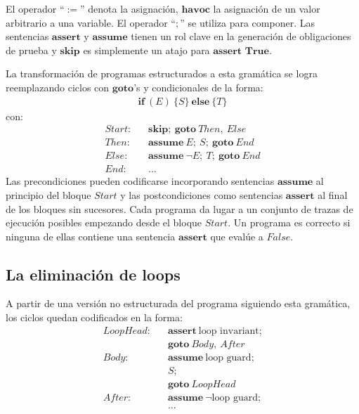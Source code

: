 \documentclass[12pt, a4paper, openany, fleqn]{book}
\begin{document}
    El operador ``$:=$'' denota la asignación, $\textbf{havoc}$ la asignación de un valor arbitrario a una variable. El operador ``$;$'' se utiliza para componer. Las sentencias $\textbf{assert}$ y $\textbf{assume}$ tienen un rol clave en la generación de obligaciones de prueba y $\textbf{skip}$ es simplemente un atajo para $\textbf{assert True}$.

    La transformación de programas estructurados a esta gramática se logra reemplazando ciclos con $\textbf{goto}$'s y condicionales de la forma:
    \begin{align*}
        \textbf{if}\ (E)\ \{S\}\ \textbf{else}\ \{T\}
    \end{align*}
    con:
    \begin{align*}
        Start:&\;\;\;\textbf{skip};\ \textbf{goto}\ Then,\ Else \\
        Then:&\;\;\;\textbf{assume}\ E;\ S;\ \textbf{goto}\ End \\
        Else:&\;\;\;\textbf{assume}\ \lnot E;\ T;\ \textbf{goto}\ End \\
        End:&\;\;\;...
    \end{align*}
    Las precondiciones pueden codificarse incorporando sentencias $\textbf{assume}$ al principio del bloque $Start$ y las postcondiciones como sentencias $\textbf{assert}$ al final de los bloques sin sucesores.
    Cada programa da lugar a un conjunto de trazas de ejecución posibles empezando desde el bloque $Start$. Un programa es correcto si ninguna de ellas contiene una sentencia $\textbf{assert}$ que evalúe a $False$.

    \subsection*{La eliminación de loops}
    A partir de una versión no estructurada del programa siguiendo esta gramática, los ciclos quedan codificados en la forma:
    \begin{align*}
        LoopHead:\;\;\;&\textbf{assert}\ \text{loop invariant};\\
                       &\textbf{goto}\ Body,\ After \\
        Body:\;\;\;&\textbf{assume}\ \text{loop guard};\\
                   &S;\\
                   &\textbf{goto}\ LoopHead \\
        After:\;\;\;&\textbf{assume}\ \lnot \text{loop guard};\\
                    & ...
    \end{align*}
\end{document}
